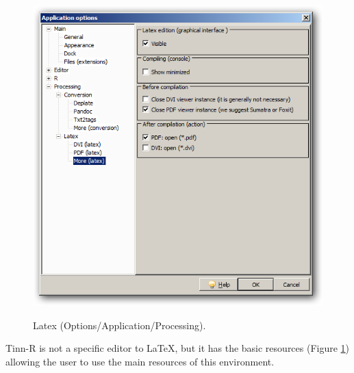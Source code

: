 \begin{figure}[h!]
  \includegraphics[scale=0.33]{./res/app_processing_latex_more.png}\\
  \caption{Latex (Options/Application/Processing).}
  \label{fig:app_processing_latex_options}
\end{figure}

Tinn-R is not a specific editor to \LaTeX, but it has the basic resources (Figure \ref{fig:app_processing_latex_options}) allowing the user to use the main resources of this environment.
